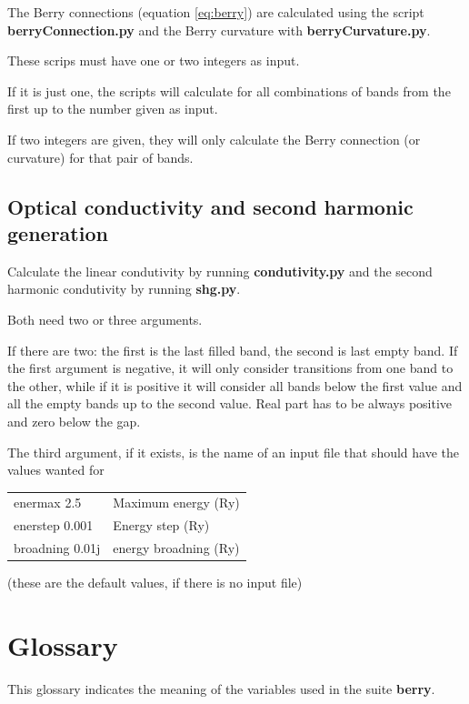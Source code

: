 \documentclass[a4paper,12pt]{report}
\begin{document}
The Berry connections (equation \ref{eq:berry}) are calculated using the script \textbf{berryConnection.py}
and the Berry curvature with \textbf{berryCurvature.py}.

These scrips must have one or two integers as input.

If it is just one, the scripts will calculate for all combinations of bands from the first up to the
number given as input.

If two integers are given, they will only calculate the Berry connection (or curvature) for that pair of bands.


\section{Optical conductivity and second harmonic generation}
Calculate the linear condutivity by running \textbf{condutivity.py}
and the second harmonic condutivity by running \textbf{shg.py}.

Both need two or three arguments.

 If there are two:  the first is the last filled band, the second is last empty band.
 If the first argument is negative, it will only consider transitions from one band to the other, while if it is positive it will consider all bands below the first value and all the empty bands up to the second value.
 Real part has to be always positive and zero below the gap.

 The third argument, if it exists, is the name of an input file that should have the values wanted for\medskip

\begin{tabularx}{\textwidth}{Xl}
 enermax  2.5            & Maximum energy (Ry)\\
 enerstep  0.001         & Energy step (Ry)\\
 broadning  0.01j        & energy broadning (Ry) \\
\end{tabularx}
\medskip

(these are the default values, if there is no input file)







\chapter{Glossary}

This glossary indicates the meaning of the variables used in the suite \textbf{berry}.
\vspace{0.5cm}
\end{document}
